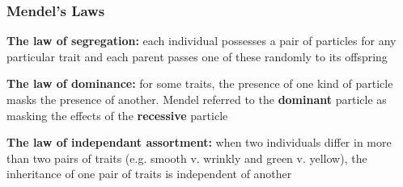 \documentclass{beamer}
\begin{document}
\begin{frame}
	\frametitle{Mendel's Laws}
	\textbf{The law of segregation: } each individual possesses a pair of particles for any particular trait and each parent passes one of these randomly to its offspring 

	\vspace{10pt}

		\textbf{The law of dominance: } for some traits, the presence of one kind of particle masks the presence of another. Mendel referred to the \textbf{dominant} particle as masking the effects of the \textbf{recessive} particle \pause
		
	\vspace{10pt}
		
			\textbf{The law of independant assortment:} when two individuals differ in more than two pairs of traits (e.g. smooth v. wrinkly and green v. yellow), the inheritance of one pair of traits is independent of another 
		
\end{frame}
\end{document}
